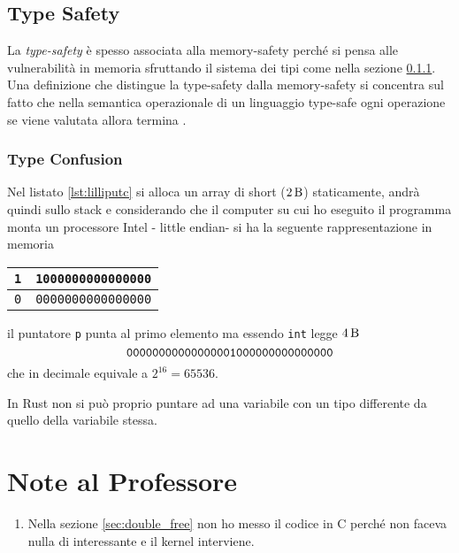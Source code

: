 \documentclass{article}
\begin{document}
\subsection{Type Safety}
La \textit{type-safety} è spesso associata alla memory-safety perché si pensa alle vulnerabilità in memoria sfruttando il sistema dei tipi come nella sezione \ref{sec:type_confusion}. Una definizione che distingue la type-safety dalla memory-safety si concentra sul fatto che nella semantica operazionale di un linguaggio type-safe ogni operazione se viene valutata allora termina \cite{typesafety}. 

\subsubsection{Type Confusion} \label{sec:type_confusion}
Nel listato \ref{lst:lilliputc} si alloca un array di short ($\SI{2}{\byte} $) staticamente, andrà quindi sullo stack e considerando che il computer su cui ho eseguito il programma monta un processore Intel - little endian- si ha la seguente rappresentazione in memoria

\begin{table}[H]
	\label{fig:mem_type_stack}
	\centering
	\begin{tabular}{|c|c|}
		\hline
		\texttt{1} & \texttt{1000000000000000} \\
		\hline 
		\texttt{0} & \texttt{0000000000000000} \\
		\hline
	\end{tabular}
\end{table}

il puntatore \texttt{p} punta al primo elemento ma essendo \texttt{int} legge $\SI{4}{\byte}$  
\[
\texttt{00000000000000001000000000000000} \\
\]
che in decimale equivale a $ 2^{16} = 65536 $.




In Rust non si può proprio puntare ad una variabile con un tipo differente da quello della variabile stessa.




\section{Note al Professore}
\begin{enumerate}
	\item Nella sezione \ref{sec:double_free} non ho messo il codice in C perché non faceva nulla di interessante e il kernel interviene.
\end{enumerate}

\clearpage
%

{}
\end{document}

